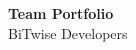 \documentclass[a4paper]{article}
\begin{document}
\begin{centering}

\Huge{\bf{Team Portfolio}} \\[1cm] \LARGE{BiTwise Developers\\[3cm]}

\end{centering}
\newpage


\newpage


\newpage


\newpage
\end{document}
